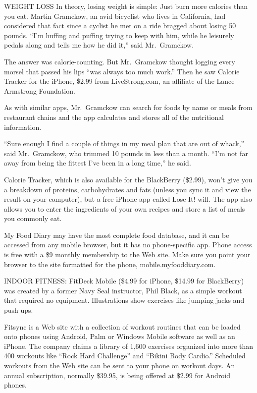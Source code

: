 ﻿\documentclass[12pt]{article}
\begin{document}
WEIGHT LOSS In theory, losing weight is simple: Just burn more calories than you eat. Martin
Gramckow, an avid\cite{avid} bicyclist who lives in California, had considered that fact since a
cyclist he met on a ride bragged about losing 50 pounds. ``I'm huffing and puffing trying to keep
with him, while he leisurely pedals along and tells me how he did it,'' said Mr.~Gramckow.

The answer was calorie-counting. But Mr.~Gramckow thought logging every morsel\cite{morsel} that
passed his lips ``was always too much work.'' Then he saw Calorie Tracker for the iPhone, \$2.99
from LiveStrong.com, an affiliate of the Lance Armstrong Foundation.

As with similar apps, Mr.~Gramckow can search for foods by name or meals from restaurant chains and
the app calculates and stores all of the nutritional information.

``Sure enough I find a couple of things in my meal plan that are out of whack\cite{whack},'' said
Mr.~Gramckow, who trimmed 10 pounds in less than a month. ``I'm not far away from being the fittest
I've been in a long time,'' he said.

Calorie Tracker, which is also available for the BlackBerry (\$2.99), won't give you a breakdown of
proteins, carbohydrates and fats (unless you sync it and view the result on your computer), but a
free iPhone app called Lose It! will. The app also allows you to enter the ingredients of your own
recipes and store a list of meals you commonly eat.

My Food Diary may have the most complete food database, and it can be accessed from any mobile
browser, but it has no phone-specific app. Phone access is free with a \$9 monthly membership to the
Web site. Make sure you point your browser to the site formatted for the phone,
mobile.myfooddiary.com.

INDOOR FITNESS: FitDeck Mobile (\$4.99 for iPhone, \$14.99 for BlackBerry) was created by a former
Navy Seal instructor, Phil Black, as a simple workout that required no equipment. Illustrations show
exercises like jumping jacks and push-ups.

Fitsync is a Web site with a collection of workout routines that can be loaded onto phones using
Android, Palm or Windows Mobile software as well as an iPhone. The company claims a library of 1,600
exercises organized into more than 400 workouts like ``Rock Hard Challenge'' and ``Bikini Body
Cardio.'' Scheduled workouts from the Web site can be sent to your phone on workout days. An annual
subscription, normally \$39.95, is being offered at \$2.99 for Android phones.
\end{document}
